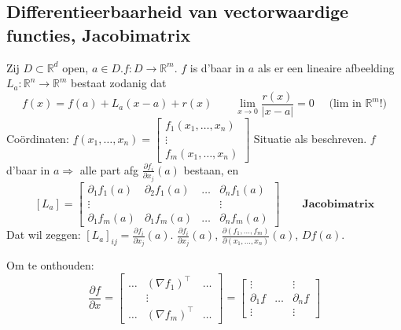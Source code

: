 \documentclass{2wa40summary}
\begin{document}
		\subsection{Differentieerbaarheid van vectorwaardige functies, Jacobimatrix}
			Zij $D \subset \mathbb{R}^d$ open, $a \in D. f: D \rightarrow \mathbb{R}^m$. $f$ is d'baar in $a$ als er een lineaire afbeelding $L_a :\mathbb{R}^n \rightarrow \mathbb{R}^m$ bestaat zodanig dat \[f(x)=f(a)+L_a (x-a) + r(x) \qquad \lim_{x \rightarrow 0} \frac{r(x)}{|x-a|} =0 \quad\text{ (lim in } \mathbb{R}^m \text{!)}\]
			Co\"ordinaten: $\underline{f}(x_1,\dots ,x_n)=\begin{bmatrix}
				f_1 (x_1, \dots ,x_n) \\
				\vdots \\
				f_m (x_1, \dots ,x_n)
			\end{bmatrix}$
			\theorem[en definitie] Situatie als beschreven. $f$ d'baar in $a \Rightarrow$ alle part afg $\frac{\partial f_i}{\partial x_j}(a)$ bestaan, en
			\[[L_a] = \begin{bmatrix}
				\partial_1 f_1 (a) & \partial_2 f_1 (a) & \dots &\partial_n f_1 (a) \\
				\vdots & & & \vdots \\
				\partial_1 f_m (a) & \partial_1 f_m (a) & \dots &\partial_n f_m (a)
			\end{bmatrix} \qquad \textbf{Jacobimatrix}\]
			Dat wil zeggen: $[L_a]_{ij}=\frac{\partial f_i}{\partial x_j}(a)$.
			\nota $\frac{\partial f_i}{\partial x_j}(a)$, $\frac{\partial (f_1,\dots,f_m)}{\partial (x_1,\dots,x_n)}(a)$, $ Df(a) $.
			
			Om te onthouden:
			\[ \frac{\partial f}{\partial x} = \begin{bmatrix}
			\dots & (\nabla f_1)^\top & \dots \\
			& \vdots & \\
			\dots & (\nabla f_m)^\top & \dots
			\end{bmatrix} =
			\begin{bmatrix}
			\vdots & & \vdots \\
			\partial_1 \underline{f} & \dots & \partial_n \underline{f} \\
			\vdots & & \vdots
			\end{bmatrix}\]
			
\end{document}
